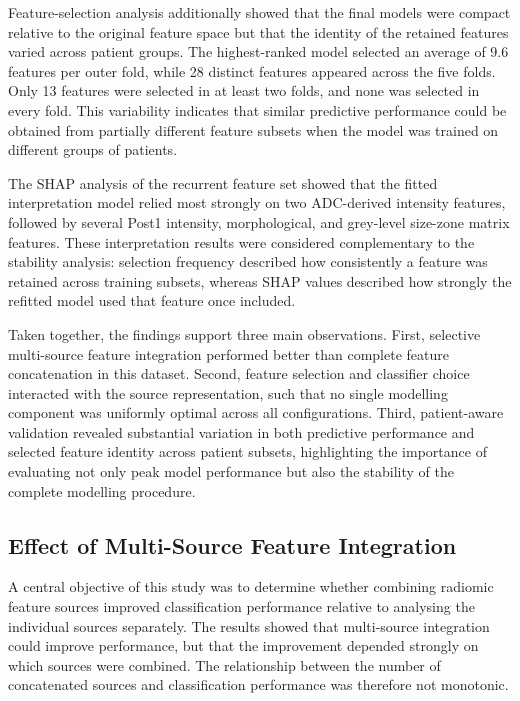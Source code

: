 \documentclass[12pt,twocolumn]{article}
\begin{document}
Feature-selection analysis additionally showed that the final models
were compact relative to the original feature space but that the
identity of the retained features varied across patient groups. The
highest-ranked model selected an average of 9.6 features per outer
fold, while 28 distinct features appeared across the five folds. Only
13 features were selected in at least two folds, and none was selected
in every fold. This variability indicates that similar predictive
performance could be obtained from partially different feature subsets
when the model was trained on different groups of patients.

The SHAP analysis of the recurrent feature set showed that the fitted
interpretation model relied most strongly on two ADC-derived intensity
features, followed by several Post1 intensity, morphological, and
grey-level size-zone matrix features. These interpretation results
were considered complementary to the stability analysis: selection
frequency described how consistently a feature was retained across
training subsets, whereas SHAP values described how strongly the
refitted model used that feature once included.

Taken together, the findings support three main observations. First,
selective multi-source feature integration performed better than
complete feature concatenation in this dataset. Second, feature
selection and classifier choice interacted with the source
representation, such that no single modelling component was uniformly
optimal across all configurations. Third, patient-aware validation
revealed substantial variation in both predictive performance and
selected feature identity across patient subsets, highlighting the
importance of evaluating not only peak model performance but also the
stability of the complete modelling procedure.










\subsection{Effect of Multi-Source Feature Integration}
\label{subsec:discussion_feature_integration}

A central objective of this study was to determine whether combining
radiomic feature sources improved classification performance relative
to analysing the individual sources separately. The results showed
that multi-source integration could improve performance, but that the
improvement depended strongly on which sources were combined. The
relationship between the number of concatenated sources and
classification performance was therefore not monotonic.
\end{document}

